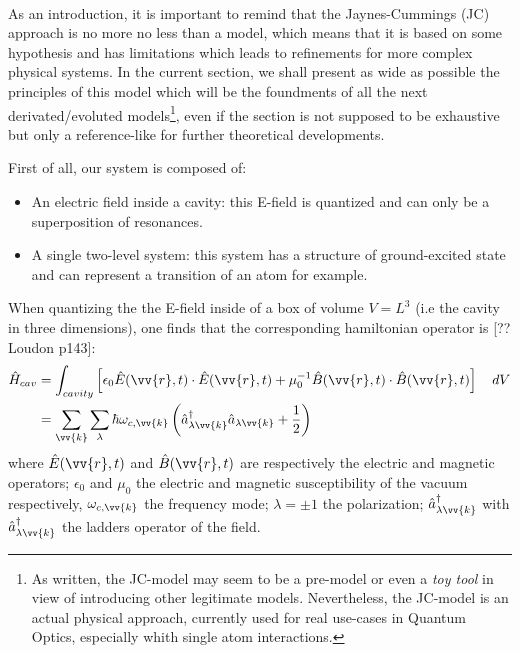 \documentclass[12pt]{report}
\begin{document}
\paragraph{}
As an introduction, it is important to remind that the Jaynes-Cummings (JC) approach is no more no less than a model, which means that it is based on some hypothesis and has limitations which leads to refinements for more complex physical systems. In the current section, we shall present as wide as possible the principles of this model which will be the foundments of all the next derivated/evoluted models\footnote{As written, the JC-model may seem to be a pre-model or even a \textit{toy tool} in view of introducing other legitimate models. Nevertheless, the JC-model is an actual physical approach, currently used for real use-cases in Quantum Optics, especially whith single atom interactions.}, even if the section is not supposed to be exhaustive but only a reference-like for further theoretical developments.

First of all, our system is composed of:
\begin{itemize}
	\item An electric field inside a cavity: this E-field is quantized and can only be a superposition of resonances.
	\item A single two-level system: this system has a structure of ground-excited state and can represent a transition of an atom for example.
\end{itemize}

When quantizing the the E-field inside of a box of volume $V = L^3$ (i.e the cavity in three dimensions), one finds that the corresponding hamiltonian operator is [??Loudon p143]:
\begin{align}
\hat{H}_{cav} &= \int_{cavity} \left[\epsilon_0 \hat{E}(\vv{r}, t) \cdot \hat{E}(\vv{r}, t) + \mu_0^{-1} \hat{B}(\vv{r}, t) \cdot \hat{B}(\vv{r}, t)\right] \quad dV\\
&= \sum_{\vv{k}} \sum_{\lambda} \hbar \omega_{c,\vv{k}} \left( \hat{a}_{\lambda \vv{k}}^\dag \hat{a}_{\lambda \vv{k}} + \frac{1}{2} \right)
\end{align}
where $\hat{E}(\vv{r}, t)$ and $\hat{B}(\vv{r}, t)$ are respectively the electric and magnetic operators; $\epsilon_0$ and $\mu_0$ the electric and magnetic susceptibility of the vacuum respectively, $\omega_{c,\vv{k}}$ the frequency mode; $\lambda=\pm 1$ the polarization; $\hat{a}_{\lambda \vv{k}}^\dag$ with $\hat{a}_{\lambda \vv{k}}^\dag$ the ladders operator of the field.
\end{document}
